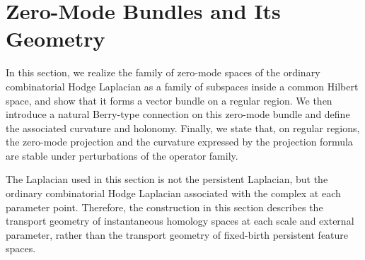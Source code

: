 \documentclass[pdflatex,sn-mathphys-num]{sn-jnl}%
\theoremstyle{thmstyleone}%
\theoremstyle{thmstyletwo}%
\theoremstyle{thmstylethree}%
\begin{document}
\section{Zero-Mode Bundles and Its Geometry}

In this section, we realize the family of zero-mode spaces of the ordinary combinatorial Hodge Laplacian as a family of subspaces inside a common Hilbert space, and show that it forms a vector bundle on a regular region. We then introduce a natural Berry-type connection on this zero-mode bundle and define the associated curvature and holonomy. Finally, we state that, on regular regions, the zero-mode projection and the curvature expressed by the projection formula are stable under perturbations of the operator family.

The Laplacian used in this section is not the persistent Laplacian, but the ordinary combinatorial Hodge Laplacian associated with the complex at each parameter point. Therefore, the construction in this section describes the transport geometry of instantaneous homology spaces at each scale and external parameter, rather than the transport geometry of fixed-birth persistent feature spaces.




\end{document}
